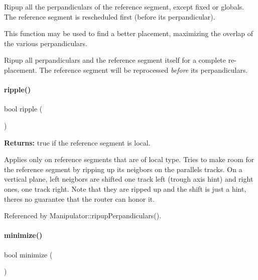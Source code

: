 Ripup all the perpandiculars of the reference segment, except fixed or globals. The reference segment is rescheduled first (before it\textquotesingle{}s perpandicular).

This function may be used to find a better placement, maximizing the overlap of the various perpandiculars.

Ripup all perpandiculars and the reference segment itself for a complete re-\/placement. The reference segment will be reprocessed {\itshape before} it\textquotesingle{}s perpandiculars. \mbox{\label{classKite_1_1Manipulator_af46102d49a7aa0c163de1bf143807794}} 
\paragraph{\texorpdfstring{ripple()}{ripple()}}
{\footnotesize\ttfamily bool ripple (\begin{DoxyParamCaption}{ }\end{DoxyParamCaption})}

{\bfseries Returns\+:} true if the reference segment is local.

Applies only on reference segments that are of local type. Tries to make room for the reference segment by ripping up it\textquotesingle{}s neigbors on the parallels tracks. On a vertical plane, left neigbors are shifted one track left (trough axis hint) and right ones, one track right. Note that they are ripped up and the shift is just a hint, there\textquotesingle{}s no guarantee that the router can honor it. 

Referenced by Manipulator\+::ripup\+Perpandiculars().

\mbox{\label{classKite_1_1Manipulator_aa61f08642d981761687635be108b9837}} 
\paragraph{\texorpdfstring{minimize()}{minimize()}}
{\footnotesize\ttfamily bool minimize (\begin{DoxyParamCaption}{ }\end{DoxyParamCaption})}

